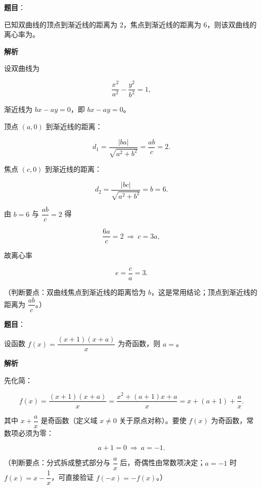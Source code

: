 \begin{answer}

\textbf{题目}：

已知双曲线的顶点到渐近线的距离为 $2$，焦点到渐近线的距离为 $6$，则该双曲线的离心率为\gkblank{}。

\textbf{解析}

设双曲线为

\nopagebreak[4]
\[\frac{x^2}{a^2}-\frac{y^2}{b^2}=1,\]

渐近线为 $bx-ay=0$，即 $bx-ay=0$。

顶点 $(a,0)$ 到渐近线的距离：

\nopagebreak[4]
\[d_1=\frac{|ba|}{\sqrt{a^2+b^2}}=\frac{ab}{c}=2.\]

焦点 $(c,0)$ 到渐近线的距离：

\nopagebreak[4]
\[d_2=\frac{|bc|}{\sqrt{a^2+b^2}}=b=6.\]

由 $b=6$ 与 $\dfrac{ab}{c}=2$ 得

\nopagebreak[4]
\[\frac{6a}{c}=2\ \Rightarrow\ c=3a,\]

故离心率

\nopagebreak[4]
\[e=\frac ca=3.\]

（判断要点：双曲线焦点到渐近线的距离恰为 $b$，这是常用结论；顶点到渐近线的距离为 $\dfrac{ab}{c}$。）


\end{answer}
\begin{answer}

\textbf{题目}：

设函数 $f(x)=\dfrac{(x+1)(x+a)}{x}$ 为奇函数，则 $a=$\gkblank{}。

\textbf{解析}

先化简：

\nopagebreak[4]
\[f(x)=\frac{(x+1)(x+a)}{x}=\frac{x^2+(a+1)x+a}{x}=x+(a+1)+\frac ax.\]

其中 $x+\dfrac ax$ 是奇函数（定义域 $x\neq0$ 关于原点对称）。要使 $f(x)$ 为奇函数，常数项必须为零：

\nopagebreak[4]
\[a+1=0\ \Rightarrow\ a=-1.\]

（判断要点：分式拆成整式部分与 $\dfrac ax$ 后，奇偶性由常数项决定；$a=-1$ 时 $f(x)=x-\dfrac1x$，可直接验证 $f(-x)=-f(x)$。）


\end{answer}
